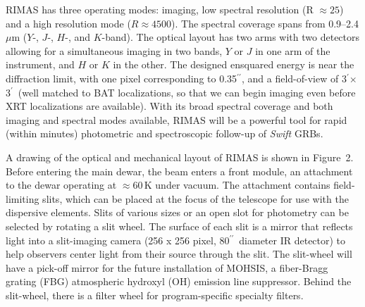 \documentclass[letterpaper,11pt]{article}
\newcommand{\arcsec}{\mbox{$^{\prime\prime}$}}%
\newcommand{\arcmin}{\mbox{$^\prime$}}%
\begin{document}
RIMAS has three operating modes: imaging, low spectral resolution (R $\approx 25$) and
a high resolution mode ($R \approx 4500$). The spectral coverage spans from 
0.9--2.4\,$\mu$m ($Y$-, $J$-, $H$-, and $K$-band).  The optical layout has two arms 
with two detectors allowing for a simultaneous imaging in two bands, $Y$ or $J$ in 
one arm of the instrument, and $H$ or $K$ in the other.  The designed ensquared
energy is near the diffraction limit, with one pixel corresponding to 0.35\arcsec, 
and a field-of-view of 3\arcmin $\times$ 3\arcmin\ (well matched to BAT localizations,
so that we can begin imaging even before XRT localizations are available).  
With its broad spectral coverage and both imaging and spectral modes available, 
RIMAS will be a powerful tool for rapid (within minutes) photometric and 
spectroscopic follow-up of \textit{Swift} GRBs.

\smallskip

A drawing of the optical and mechanical layout of RIMAS is shown in Figure~2.
Before entering the main dewar, the beam enters a front module, an attachment to the 
dewar operating at $\approx 60$\,K under vacuum. The attachment contains field-limiting 
slits, which can be placed at the focus of the telescope for use with the 
dispersive elements. Slits of various sizes or an open slot for photometry can be selected by 
rotating a slit wheel. The surface of each slit is a mirror that reflects light into a slit-imaging 
camera (256 x 256 pixel, 80\arcsec\ diameter IR detector) to help observers center light from 
their source through the slit.  The slit-wheel will have a pick-off mirror for the future 
installation of MOHSIS, a fiber-Bragg grating (FBG) atmospheric hydroxyl (OH) emission 
line suppressor. Behind the slit-wheel, there is a  filter wheel for program-specific specialty filters. 
\end{document}
